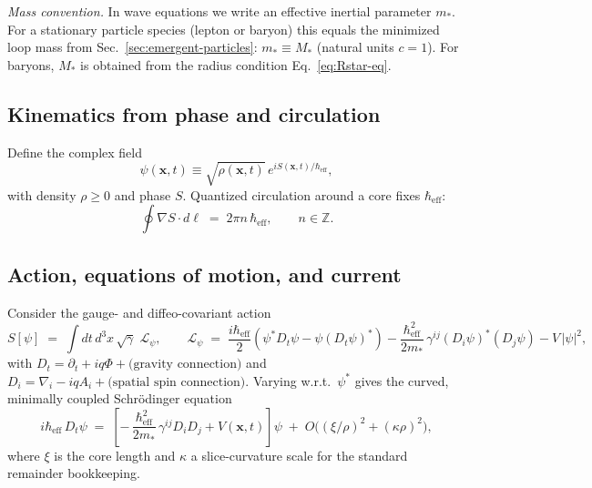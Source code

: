 \noindent\emph{Mass convention.} In wave equations we write an effective inertial parameter \(m_*\). For a stationary particle species (lepton or baryon) this equals the minimized loop mass from Sec.~\ref{sec:emergent-particles}: \(m_* \equiv M_\ast\) (natural units \(c{=}1\)). For baryons, \(M_\ast\) is obtained from the radius condition Eq.~\eqref{eq:Rstar-eq}.

\subsection{Kinematics from phase and circulation}
\label{sec:QM_madelung}

Define the complex field
\begin{equation}
\psi(\mathbf{x},t) \equiv \sqrt{\rho(\mathbf{x},t)}\,e^{i S(\mathbf{x},t)/\hbar_{\mathrm{eff}}}, 
\label{eq:psi_polar}
\end{equation}
with density \(\rho\ge 0\) and phase \(S\). Quantized circulation around a core fixes \(\hbar_{\mathrm{eff}}\):
\begin{equation}
\oint \nabla S \cdot d\boldsymbol{\ell} \;=\; 2\pi n\,\hbar_{\mathrm{eff}}, \qquad n\in\mathbb{Z}.
\label{eq:circulation-quant}
\end{equation}

\subsection{Action, equations of motion, and current}
\label{sec:QM_action}

Consider the gauge- and diffeo-covariant action
\begin{equation}
S[\psi] \;=\; \int dt\, d^3x\, \sqrt{\gamma}\;\mathcal{L}_\psi,\qquad
\mathcal{L}_\psi \;=\; \frac{i\hbar_{\mathrm{eff}}}{2}\!\left(\psi^* D_t\psi - \psi (D_t\psi)^*\right)
- \frac{\hbar_{\mathrm{eff}}^2}{2m_*}\,\gamma^{ij}(D_i\psi)^*(D_j\psi) - V\,|\psi|^2 ,
\label{eq:Spsi_full}
\end{equation}
with \(D_t=\partial_t + iq\Phi + \text{(gravity connection)}\) and \(D_i=\nabla_i - iqA_i + \text{(spatial spin connection)}\). Varying w.r.t.\ \(\psi^*\) gives the curved, minimally coupled Schr\"odinger equation
\begin{equation}
i\hbar_{\mathrm{eff}}\,D_t \psi \;=\; \left[-\,\frac{\hbar_{\mathrm{eff}}^2}{2m_*}\,\gamma^{ij}D_i D_j + V(\mathbf{x},t)\right]\psi
\;+\; O\!\Big((\xi/\rho)^2 + (\kappa\rho)^2\Big),
\label{eq:schrodinger}
\end{equation}
where \(\xi\) is the core length and \(\kappa\) a slice-curvature scale for the standard remainder bookkeeping.

